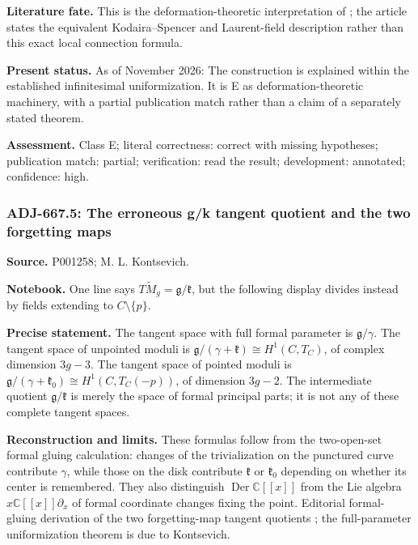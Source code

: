 \noindent\textbf{Literature fate.} This is the deformation-theoretic interpretation of \citet[\S1]{kontsevich1987virasoro}; the article states the equivalent Kodaira--Spencer and Laurent-field description rather than this exact local connection formula.\par

\noindent\textbf{Present status.} As of November 2026: The construction is explained within the established infinitesimal uniformization. It is E as deformation-theoretic machinery, with a partial publication match rather than a claim of a separately stated theorem.\par

\noindent\textbf{Assessment.} Class E; literal correctness: correct with missing hypotheses; publication match: partial; verification: read the result; development: annotated; confidence: high.\par

\subsubsection{ADJ-667.5: The erroneous g/k tangent quotient and the two forgetting maps}
\noindent\textbf{Source.} P001258; M. L. Kontsevich.\par
\noindent\textbf{Notebook.} One line says \(T\widetilde M_g=\mathfrak g/\mathfrak k\), but the following display divides instead by fields extending to \(C\setminus\{p\}\).\par

\noindent\textbf{Precise statement.} The tangent space with full formal parameter is \(\mathfrak g/\gamma\). The tangent space of unpointed moduli is \(\mathfrak g/(\gamma+\mathfrak k)\cong H^1(C,T_C)\), of complex dimension \(3g-3\). The tangent space of pointed moduli is \(\mathfrak g/(\gamma+\mathfrak k_0)\cong H^1(C,T_C(-p))\), of dimension \(3g-2\). The intermediate quotient \(\mathfrak g/\mathfrak k\) is merely the space of formal principal parts; it is not any of these complete tangent spaces.\par

\noindent\textbf{Reconstruction and limits.} These formulas follow from the two-open-set formal gluing calculation: changes of the trivialization on the punctured curve contribute \(\gamma\), while those on the disk contribute \(\mathfrak k\) or \(\mathfrak k_0\) depending on whether its center is remembered. They also distinguish \(\operatorname{Der}\mathbb C[[x]]\) from the Lie algebra \(x\mathbb C[[x]]\partial_x\) of formal coordinate changes fixing the point. Editorial formal-gluing derivation of the two forgetting-map tangent quotients \ours; the full-parameter uniformization theorem is due to Kontsevich.\par

